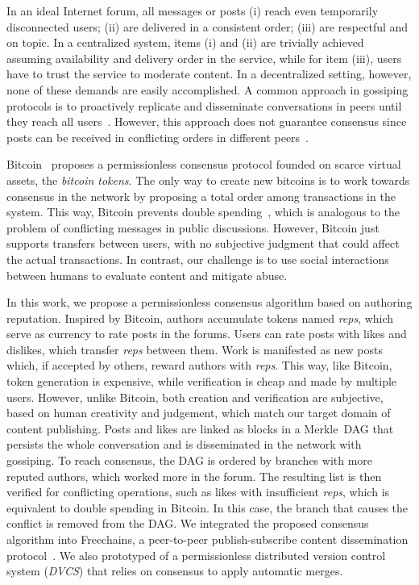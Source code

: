 \documentclass[10pt,journal,compsoc]{IEEEtran}
\newcommand{\reps}     {\emph{reps}\xspace}
\begin{document}
In an ideal Internet forum, all messages or posts
(i)   reach even temporarily disconnected users;
(ii)  are delivered in a consistent order;
(iii) are respectful and on topic.
In a centralized system, items (i) and (ii) are trivially achieved assuming
availability and delivery order in the service, while for item (iii), users
have to trust the service to moderate content.
In a decentralized setting, however, none of these demands are easily
accomplished.
A common approach in gossiping protocols is to proactively replicate and
disseminate conversations in peers until they reach all
users~\cite{p2p.survey}.
However, this approach does not guarantee consensus since posts can be received
in conflicting orders in different peers~\cite{p2p.intention}.

Bitcoin~\cite{p2p.bitcoin} proposes a permissionless consensus protocol founded
on scarce virtual assets, the \emph{bitcoin tokens}.
%
The only way to create new bitcoins is to work towards consensus in the network
by proposing a total order among transactions in the system.
%
This way, Bitcoin prevents double spending~\cite{p2p.bitcoin}, which is
analogous to the problem of conflicting messages in public discussions.
%
However, Bitcoin just supports transfers between users, with no subjective
judgment that could affect the actual transactions.
In contrast, our challenge is to use social interactions between humans to
evaluate content and mitigate abuse.

In this work, we propose a permissionless consensus algorithm based on
authoring reputation.
Inspired by Bitcoin, authors accumulate tokens named \reps, which serve as
currency to rate posts in the forums.
Users can rate posts with likes and dislikes, which transfer \reps between
them.
Work is manifested as new posts which, if accepted by others, reward authors
with \reps.
This way, like Bitcoin, token generation is expensive, while verification is
cheap and made by multiple users.
However, unlike Bitcoin, both creation and verification are subjective, based
on human creativity and judgement, which match our target domain of content
publishing.
Posts and likes are linked as blocks in a Merkle~DAG that persists the whole
conversation and is disseminated in the network with gossiping.
To reach consensus, the DAG is ordered by branches with more reputed authors,
which worked more in the forum.
The resulting list is then verified for conflicting operations, such as likes
with insufficient \reps, which is equivalent to double spending in Bitcoin.
In this case, the branch that causes the conflict is removed from the DAG.
%
We integrated the proposed consensus algorithm into Freechains, a peer-to-peer
publish-subscribe content dissemination protocol~\cite{fcs.sbseg20}.
We also prototyped of a permissionless distributed version control system
(\emph{DVCS}) that relies on consensus to apply automatic merges.
\end{document}
